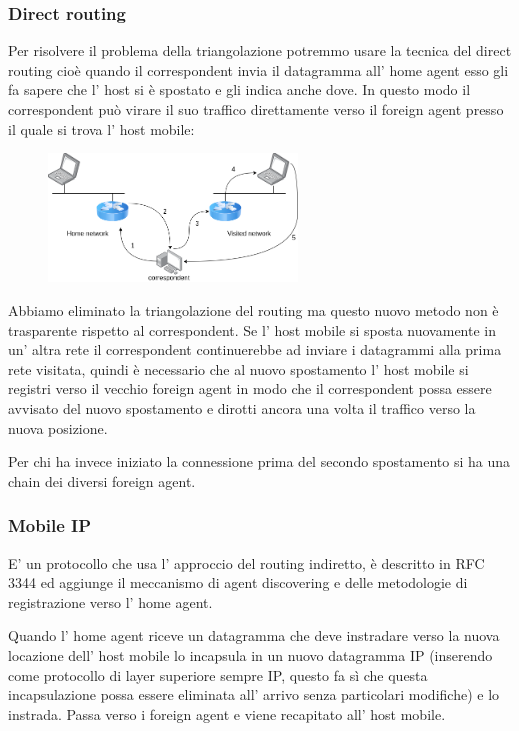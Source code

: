 \subsubsection{Direct routing}
Per risolvere il problema della triangolazione potremmo usare la tecnica del direct routing cioè quando il correspondent invia il datagramma all' home agent esso gli fa sapere che l' host si è spostato e gli indica anche dove.
In questo modo il correspondent può virare il suo traffico direttamente verso il foreign agent presso il quale si trova l' host mobile:
\begin{figure}[H]
    \centering
    \includegraphics[width=250px]{images/8_Wireless_Mobile/direct_routing.png}
\end{figure}

Abbiamo eliminato la triangolazione del routing ma questo nuovo metodo non è trasparente rispetto al correspondent.
Se l' host mobile si sposta nuovamente in un' altra rete il correspondent continuerebbe ad inviare i datagrammi alla prima rete visitata, quindi è necessario che al nuovo spostamento l' host mobile si registri verso il vecchio foreign agent in modo che il correspondent possa essere avvisato del nuovo spostamento e dirotti ancora una volta il traffico verso la nuova posizione.

Per chi ha invece iniziato la connessione prima del secondo spostamento si ha una chain dei diversi foreign agent.

\subsubsection{Mobile IP}
E' un protocollo che usa l' approccio del routing indiretto, è descritto in RFC 3344 ed aggiunge il meccanismo di agent discovering e delle metodologie di registrazione verso l' home agent.

Quando l' home agent riceve un datagramma che deve instradare verso la nuova locazione dell' host mobile lo incapsula in un nuovo datagramma IP (inserendo come protocollo di layer superiore sempre IP, questo fa sì che questa incapsulazione possa essere eliminata all' arrivo senza particolari modifiche) e lo instrada.
Passa verso i foreign agent e viene recapitato all' host mobile.

